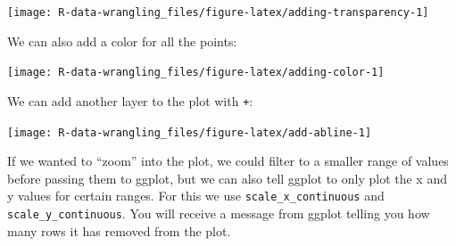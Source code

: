 \documentclass[]{book}
\newenvironment{Shaded}{\begin{snugshade}}{\end{snugshade}}
\newcommand{\KeywordTok}[1]{\textcolor[rgb]{0.13,0.29,0.53}{\textbf{#1}}}
\newcommand{\DataTypeTok}[1]{\textcolor[rgb]{0.13,0.29,0.53}{#1}}
\newcommand{\DecValTok}[1]{\textcolor[rgb]{0.00,0.00,0.81}{#1}}
\newcommand{\FloatTok}[1]{\textcolor[rgb]{0.00,0.00,0.81}{#1}}
\newcommand{\StringTok}[1]{\textcolor[rgb]{0.31,0.60,0.02}{#1}}
\newcommand{\OperatorTok}[1]{\textcolor[rgb]{0.81,0.36,0.00}{\textbf{#1}}}
\newcommand{\NormalTok}[1]{#1}
\theoremstyle{definition}
\theoremstyle{definition}
\theoremstyle{definition}
\theoremstyle{remark}
\begin{document}
\texttt{[image: R-data-wrangling\_files/figure-latex/adding-transparency-1]}

We can also add a color for all the points:

\begin{Shaded}
\end{Shaded}

\texttt{[image: R-data-wrangling\_files/figure-latex/adding-color-1]}

We can add another layer to the plot with \texttt{+}:

\begin{Shaded}
\end{Shaded}

\texttt{[image: R-data-wrangling\_files/figure-latex/add-abline-1]}

If we wanted to ``zoom'' into the plot, we could filter to a smaller
range of values before passing them to ggplot, but we can also tell
ggplot to only plot the x and y values for certain ranges. For this we
use \texttt{scale\_x\_continuous} and \texttt{scale\_y\_continuous}. You
will receive a message from ggplot telling you how many rows it has
removed from the plot.
\end{document}
